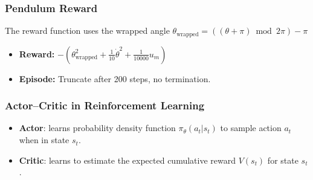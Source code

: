 \documentclass[aspectratio=169,11pt,xcolor=dvipsnames]{beamer}
\begin{document}
\begin{frame}
  \frametitle{Pendulum Reward}
  \begin{center}
    \begin{minipage}{.8\textwidth}
      The reward function uses the wrapped angle $\theta_{\text{wrapped}} = ((\theta + \pi) \bmod 2\pi) - \pi$
      \begin{itemize}
        \item \textbf{Reward:} $-(\theta_{\text{wrapped}}^2 + \frac{1}{10}\dot{\theta}^2 + \frac{1}{10000}u_m)$
        \item \textbf{Episode:} Truncate after 200 steps, no termination.
      \end{itemize}
    \end{minipage}
  \end{center}
\end{frame}

\begin{frame}
  \frametitle{Actor--Critic in Reinforcement Learning}
  \begin{itemize}
    \item \textbf{Actor}: learns probability density function $\pi_\theta(a_t|s_t)$ to sample action $a_t$ when in state $s_t$.
    \item \textbf{Critic}: learns to estimate the expected cumulative reward $V(s_t)$ for state $s_t$.
  \end{itemize}
\end{frame}
\end{document}
